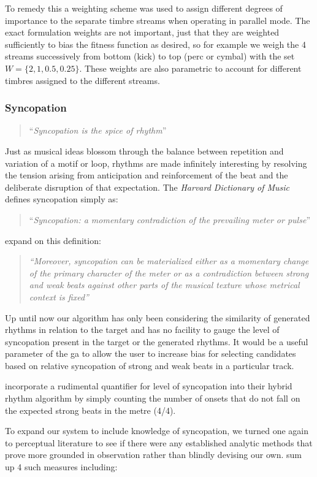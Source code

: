 {{{To remedy this a weighting scheme was used to assign different degrees of importance to the separate timbre streams when operating in parallel mode. The exact formulation weights are not important, just that they are weighted sufficiently to bias the fitness function as desired, so for example we weigh the 4 streams successively from bottom (kick) to top (perc or cymbal) with  the set $W = \{2, 1, 0.5, 0.25\}$. These weights are also parametric to account for different timbres assigned to the different streams.

\subsubsection{Syncopation}

\blockcquote[]{Toussaint2013}{``\textit{Syncopation is the spice of rhythm}''}

Just as musical ideas blossom through the balance between repetition and variation of a motif or loop, rhythms are made infinitely interesting by resolving the tension arising from anticipation and reinforcement of the beat and the deliberate disruption of that expectation. The \textit{Harvard Dictionary of Music} defines syncopation simply as:

\blockcquote[]{Apel1969}{``\textit{Syncopation: a momentary contradiction of the prevailing meter or pulse}''}

\cite{Gomez2005} expand on this definition:

\blockquote{\textit{``Moreover, syncopation can be materialized either as a momentary change of the primary character of the meter or as a contradiction between strong and weak beats against other parts of the musical texture whose metrical context is fixed''}}

Up until now our algorithm has only been considering the similarity of generated rhythms in relation to the target and has no facility to gauge the level of syncopation present in the target or the generated rhythms. It would be a useful parameter of the \acrshort{ga} to allow the user to increase bias for selecting candidates based on relative syncopation of strong and weak beats in a particular track.  

\cite{Eigenfeldt2013} incorporate a rudimental quantifier for level of syncopation into their hybrid rhythm algorithm by simply counting the number of onsets that do not fall on the expected strong beats in the metre (4/4).

To expand our system to include knowledge of syncopation, we turned one again to perceptual literature to see if there were any established analytic methods that prove more grounded in observation rather than blindly devising our own. \cite{Gomez2005} sum up 4 such measures including:

}}}
